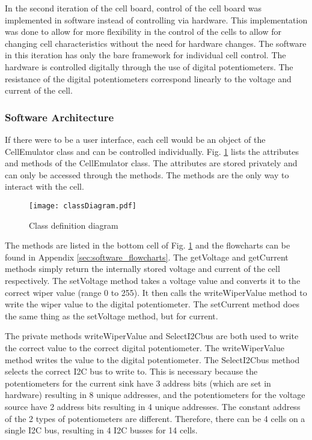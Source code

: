 In the second iteration of the cell board, control of the cell board was implemented in software instead of controlling via hardware.
This implementation was done to allow for more flexibility in the control of the cells to allow for changing cell characteristics without the need for hardware changes.
The software in this iteration has only the bare framework for individual cell control.
The hardware is controlled digitally through the use of digital potentiometers. The resistance of the digital potentiometers correspond linearly to the voltage and current of the cell.

\subsubsection{Software Architecture}
If there were to be a user interface, each cell would be an object of the CellEmulator class and can be controlled individually. Fig. \ref{fig:classDiagram} lists the attributes and methods of the CellEmulator class. The attributes are stored privately and can only be accessed through the methods. The methods are the only way to interact with the cell. 
\FloatBarrier
\begin{figure}[ht!]
    \centering
    \texttt{[image: classDiagram.pdf]}
    \caption{Class definition diagram}
    \label{fig:classDiagram}
\end{figure}
\FloatBarrier
The methods are listed in the bottom cell of Fig. \ref{fig:classDiagram} and the flowcharts can be found in Appendix \ref{sec:software_flowcharts}. The getVoltage and getCurrent methods simply return the internally stored voltage and current of the cell respectively. The setVoltage method takes a voltage value and converts it to the correct wiper value (range 0 to 255). It then calls the writeWiperValue method to write the wiper value to the digital potentiometer. The setCurrent method does the same thing as the setVoltage method, but for current.

The private methods writeWiperValue and SelectI2Cbus are both used to write the correct value to the correct digital potentiometer. The writeWiperValue method writes the value to the digital potentiometer. The SelectI2Cbus method selects the correct I2C bus to write to. 
This is necessary because the potentiometers for the current sink have 3 address bits (which are set in hardware) resulting in 8 unique addresses, and the potentiometers for the voltage source have 2 address bits resulting in 4 unique addresses. The constant address of the 2 types of potentiometers are different. Therefore, there can be 4 cells on a single I2C bus, resulting in 4 I2C busses for 14 cells. 
